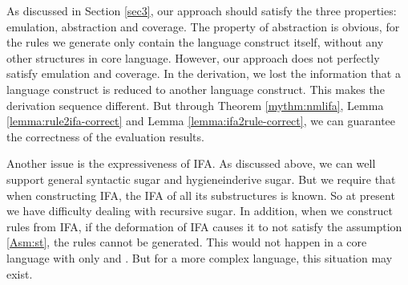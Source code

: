 

As discussed in Section \ref{sec3}, our approach should satisfy the three properties: emulation, abstraction and coverage. The property of abstraction is obvious, for the rules we generate only contain the language construct itself, without any other structures in core language. However, our approach does not perfectly satisfy emulation and coverage. In the derivation, we lost the information that a language construct is reduced to another language construct. This makes the derivation sequence different. But through Theorem \ref{mythm:nmlifa}, Lemma \ref{lemma:rule2ifa-correct} and Lemma \ref{lemma:ifa2rule-correct}, we can guarantee the correctness of the evaluation results.

Another issue is the expressiveness of IFA. As discussed above, we can well support general syntactic sugar and hygieneinderive sugar. But we require that when constructing IFA, the IFA of all its substructures is known. So at present we have difficulty dealing with recursive sugar. In addition, when we construct rules from IFA, if the deformation of IFA causes it to not satisfy the assumption \ref{Asm:st}, the rules cannot be generated. This would not happen in a core language with only  and . But for a more complex language, this situation may exist.